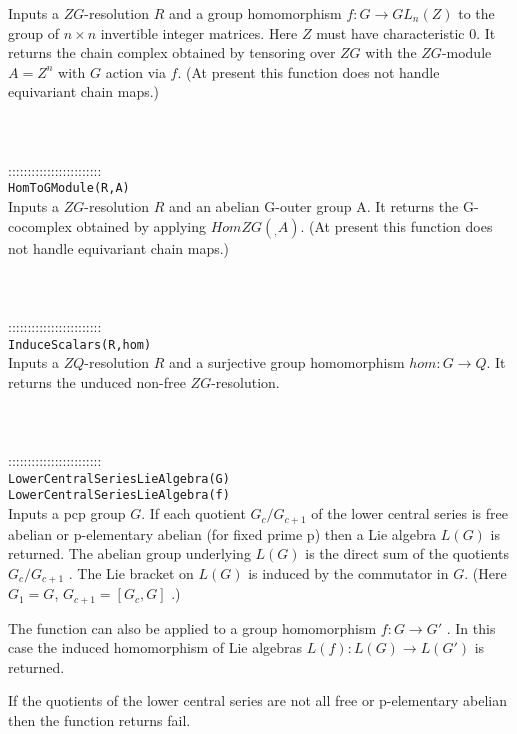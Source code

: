 \documentclass[a4paper,11pt]{report}
\begin{document}
{ Inputs a $ZG$-resolution $R$ and a group homomorphism $f:G \longrightarrow GL_n(Z)$ to the group of $n{\ensuremath{\times}}n$ invertible integer matrices. Here $Z$ must have characteristic 0. It returns the chain complex obtained by tensoring
over $ZG$ with the $ZG$-module $A=Z^n$ with $G$ action via $f$. (At present this function does not handle equivariant chain maps.) \\
 \\
 \\
 \\
 ::::::::::::::::::::::::\\
 \texttt{HomToGModule(R,A) }\\
 

 Inputs a $ZG$-resolution $R$ and an abelian G-outer group A. It returns the G-cocomplex obtained by
applying $HomZG( _ , A)$. (At present this function does not handle equivariant chain maps.) \\
 \\
 \\
 \\
 ::::::::::::::::::::::::\\
 \texttt{InduceScalars(R,hom) }\\
 

 Inputs a $ZQ$-resolution $R$ and a surjective group homomorphism $hom:G\rightarrow Q$. It returns the unduced non-free $ZG$-resolution. \\
 \\
 \\
 \\
 ::::::::::::::::::::::::\\
 \texttt{LowerCentralSeriesLieAlgebra(G) }\\
 \texttt{LowerCentralSeriesLieAlgebra(f) }\\
 

 Inputs a pcp group $G$. If each quotient $G_c/G_{c+1}$ of the lower central series is free abelian or p-elementary abelian (for fixed
prime p) then a Lie algebra $L(G)$ is returned. The abelian group underlying $L(G)$ is the direct sum of the quotients $G_c/G_{c+1}$ . The Lie bracket on $L(G)$ is induced by the commutator in $G$. (Here $G_1=G$, $G_{c+1}=[G_c,G]$ .) 

 The function can also be applied to a group homomorphism $f: G \longrightarrow G'$ . In this case the induced homomorphism of Lie algebras $L(f):L(G) \longrightarrow L(G')$ is returned.

 If the quotients of the lower central series are not all free or p-elementary
abelian then the function returns fail.

}
\end{document}

